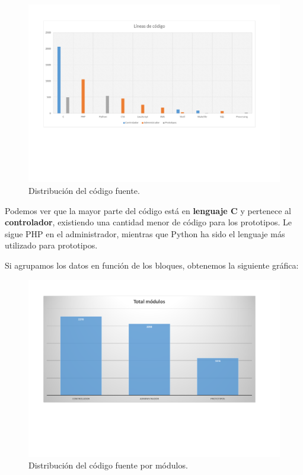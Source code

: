 \begin{figure}[H]
	\noindent \begin{centering}
		\includegraphics[clip=true,trim=50 180 50 50,width=\linewidth]{capitulo5/lineas}
		\par\end{centering}
	\smallskip
	\caption{\label{fig:lineas} Distribución del código fuente.}
\end{figure} 

\smallskip

Podemos ver que la mayor parte del código está en \textbf{lenguaje C} y pertenece al \textbf{controlador}, existiendo una cantidad menor de código para los prototipos. Le sigue PHP en el administrador, mientras que Python ha sido el lenguaje más utilizado para prototipos.

Si agrupamos los datos en función de los bloques, obtenemos la siguiente gráfica:

\smallskip

\begin{figure}[H]
	\noindent \begin{centering}
		\includegraphics[clip=true,trim=50 180 50 50,width=\linewidth]{capitulo5/lineas_modulos}
		\par\end{centering}
	\smallskip
	\caption{\label{fig:lineas_modulos} Distribución del código fuente por módulos.}
\end{figure} 

